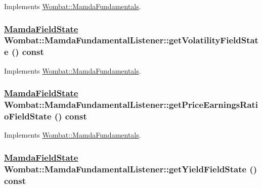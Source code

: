 Implements \hyperlink{classWombat_1_1MamdaFundamentals_e7eef94f859304d1fee6183dcef41680}{Wombat::Mamda\-Fundamentals}.\hypertarget{classWombat_1_1MamdaFundamentalListener_941388a4d6f212cec924cebf8d49933a}{
\subsubsection[getVolatilityFieldState]{\setlength{\rightskip}{0pt plus 5cm}\hyperlink{namespaceWombat_93aac974f2ab713554fd12a1fa3b7d2a}{Mamda\-Field\-State} Wombat::Mamda\-Fundamental\-Listener::get\-Volatility\-Field\-State () const}}
\label{classWombat_1_1MamdaFundamentalListener_941388a4d6f212cec924cebf8d49933a}




Implements \hyperlink{classWombat_1_1MamdaFundamentals_e84cec28dfd0ea05f96bca760df88f8f}{Wombat::Mamda\-Fundamentals}.\hypertarget{classWombat_1_1MamdaFundamentalListener_39858ced30ea763c49091af7ef682d73}{
\subsubsection[getPriceEarningsRatioFieldState]{\setlength{\rightskip}{0pt plus 5cm}\hyperlink{namespaceWombat_93aac974f2ab713554fd12a1fa3b7d2a}{Mamda\-Field\-State} Wombat::Mamda\-Fundamental\-Listener::get\-Price\-Earnings\-Ratio\-Field\-State () const}}
\label{classWombat_1_1MamdaFundamentalListener_39858ced30ea763c49091af7ef682d73}




Implements \hyperlink{classWombat_1_1MamdaFundamentals_41e962b3c691f2a355f1b66ccdc3a6a5}{Wombat::Mamda\-Fundamentals}.\hypertarget{classWombat_1_1MamdaFundamentalListener_e2ef62938cccc0dfd0248b42f8666314}{
\subsubsection[getYieldFieldState]{\setlength{\rightskip}{0pt plus 5cm}\hyperlink{namespaceWombat_93aac974f2ab713554fd12a1fa3b7d2a}{Mamda\-Field\-State} Wombat::Mamda\-Fundamental\-Listener::get\-Yield\-Field\-State () const}}
\label{classWombat_1_1MamdaFundamentalListener_e2ef62938cccc0dfd0248b42f8666314}




